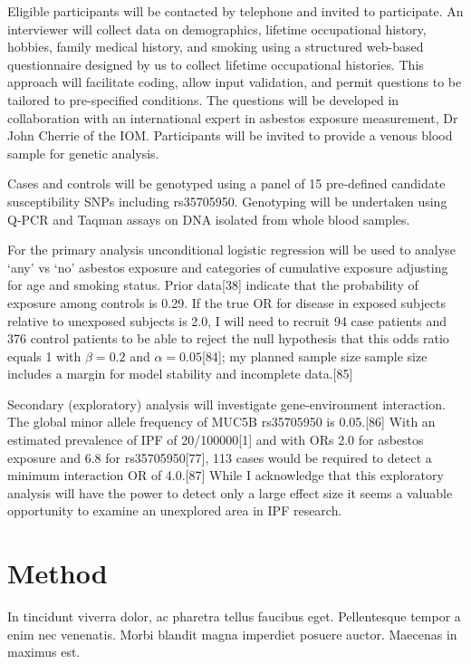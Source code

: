 \documentclass[12pt,a4paper,]{report}
\begin{document}
Eligible participants will be contacted by telephone and invited to
participate. An interviewer will collect data on demographics, lifetime
occupational history, hobbies, family medical history, and smoking using
a structured web-based questionnaire designed by us to collect lifetime
occupational histories. This approach will facilitate coding, allow
input validation, and permit questions to be tailored to pre-specified
conditions. The questions will be developed in collaboration with an
international expert in asbestos exposure measurement, Dr John Cherrie
of the IOM. Participants will be invited to provide a venous blood
sample for genetic analysis.

Cases and controls will be genotyped using a panel of 15 pre-defined
candidate susceptibility SNPs including rs35705950. Genotyping will be
undertaken using Q-PCR and Taqman assays on DNA isolated from whole
blood samples.

For the primary analysis unconditional logistic regression will be used
to analyse `any' vs `no' asbestos exposure and categories of cumulative
exposure adjusting for age and smoking status. Prior data{[}38{]}
indicate that the probability of exposure among controls is 0.29. If the
true OR for disease in exposed subjects relative to unexposed subjects
is 2.0, I will need to recruit 94 case patients and 376 control patients
to be able to reject the null hypothesis that this odds ratio equals 1
with \ensuremath{\beta = 0.2} and \ensuremath{\alpha = 0.05}{[}84{]}; my
planned sample size sample size includes a margin for model stability
and incomplete data.{[}85{]}

Secondary (exploratory) analysis will investigate gene-environment
interaction. The global minor allele frequency of MUC5B rs35705950 is
0.05.{[}86{]} With an estimated prevalence of IPF of 20/100000{[}1{]}
and with ORs 2.0 for asbestos exposure and 6.8 for rs35705950{[}77{]},
113 cases would be required to detect a minimum interaction OR of
4.0.{[}87{]} While I acknowledge that this exploratory analysis will
have the power to detect only a large effect size it seems a valuable
opportunity to examine an unexplored area in IPF research.

\hypertarget{method-4}{%
\section{Method}\label{method-4}}

In tincidunt viverra dolor, ac pharetra tellus faucibus eget.
Pellentesque tempor a enim nec venenatis. Morbi blandit magna imperdiet
posuere auctor. Maecenas in maximus est.
\end{document}
